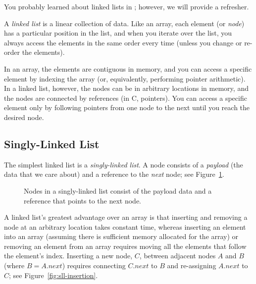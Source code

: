 You probably learned about linked lists in \cstwo; however, we will provide a refresher.

A \textit{linked list} is a linear collection of data.
Like an array, each element (or \textit{node}) has a particular position in the list, and when you iterate over the list, you always access the elements in the same order every time (unless you change or re-order the elements).

In an array, the elements are contiguous in memory, and you can access a specific element by indexing the array (or, equivalently, performing pointer arithmetic).
In a linked list, however, the nodes can be in arbitrary locations in memory, and the nodes are connected by references (in C, pointers).
You can access a specific element only by following pointers from one node to the next until you reach the desired node.


\subsection{Singly-Linked List} \label{subsec:singlylinkedlist}

The simplest linked list is a \textit{singly-linked list}.
A node consists of a \textit{payload} (the data that we care about) and a reference to the \textit{next} node;
see Figure~\ref{fig:singly-linked-list}.

\begin{figure}[h]
    \centering
    \caption{Nodes in a singly-linked list consist of the payload data and a reference that points to the next node.}\label{fig:singly-linked-list}
\end{figure}

A linked list's greatest advantage over an array is that inserting and removing a node at an arbitrary location takes constant time, whereas inserting an element into an array (assuming there is sufficient memory allocated for the array) or removing an element from an array requires moving all the elements that follow the element's index.
Inserting a new node, $C$, between adjacent nodes $A$ and $B$ (where $B = A.next$) requires connecting $C.next$ to $B$ and re-assigning $A.next$ to $C$;
see Figure~\ref{fig:sll-insertion}.

